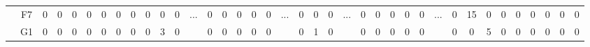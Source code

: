 \documentclass[12pt]{article}
\begin{document}
\begin{table}[!ht]
{\begin{tabular}{cccccccccccccccccccccccccccccccccccccc}
\multicolumn{1}{c|}{}                       & \multicolumn{1}{c|}{F7}  & \multicolumn{1}{c|}{0}  & \multicolumn{1}{c|}{0}  & \multicolumn{1}{c|}{0}  & \multicolumn{1}{c|}{0}  & \multicolumn{1}{c|}{0}  & \multicolumn{1}{c|}{0}  & \multicolumn{1}{c|}{0}  & \multicolumn{1}{c|}{0}  & \multicolumn{1}{c|}{0}  & \multicolumn{1}{c|}{0}  & \multicolumn{1}{c|}{\multirow{8}{*}{...}} & \multicolumn{1}{c|}{0}  & \multicolumn{1}{c|}{0}  & \multicolumn{1}{c|}{0}  & \multicolumn{1}{c|}{0}  & \multicolumn{1}{c|}{0}  & \multicolumn{1}{c|}{\multirow{8}{*}{...}} & \multicolumn{1}{c|}{0}  & \multicolumn{1}{c|}{0}  & \multicolumn{1}{c|}{0}  & \multicolumn{1}{c|}{\multirow{8}{*}{...}} & \multicolumn{1}{c|}{0}  & \multicolumn{1}{c|}{0}  & \multicolumn{1}{c|}{0}  & \multicolumn{1}{c|}{0}  & \multicolumn{1}{c|}{0}  & \multicolumn{1}{c|}{\multirow{8}{*}{...}} & \multicolumn{1}{c|}{0}  & \multicolumn{1}{c|}{15} & \multicolumn{1}{c|}{0}  & \multicolumn{1}{c|}{0}  & \multicolumn{1}{c|}{0}  & \multicolumn{1}{c|}{0}  & \multicolumn{1}{c|}{0}  & \multicolumn{1}{c|}{0}  & \multicolumn{1}{c|}{0}  \\ \cline{2-12} \cline{14-18} \cline{20-22} \cline{24-28} \cline{30-38} 
\multicolumn{1}{c|}{}                       & \multicolumn{1}{c|}{G1}  & \multicolumn{1}{c|}{0}  & \multicolumn{1}{c|}{0}  & \multicolumn{1}{c|}{0}  & \multicolumn{1}{c|}{0}  & \multicolumn{1}{c|}{0}  & \multicolumn{1}{c|}{0}  & \multicolumn{1}{c|}{0}  & \multicolumn{1}{c|}{0}  & \multicolumn{1}{c|}{3}  & \multicolumn{1}{c|}{0}  & \multicolumn{1}{c|}{}                     & \multicolumn{1}{c|}{0}  & \multicolumn{1}{c|}{0}  & \multicolumn{1}{c|}{0}  & \multicolumn{1}{c|}{0}  & \multicolumn{1}{c|}{0}  & \multicolumn{1}{c|}{}                     & \multicolumn{1}{c|}{0}  & \multicolumn{1}{c|}{1}  & \multicolumn{1}{c|}{0}  & \multicolumn{1}{c|}{}                     & \multicolumn{1}{c|}{0}  & \multicolumn{1}{c|}{0}  & \multicolumn{1}{c|}{0}  & \multicolumn{1}{c|}{0}  & \multicolumn{1}{c|}{0}  & \multicolumn{1}{c|}{}                     & \multicolumn{1}{c|}{0}  & \multicolumn{1}{c|}{0}  & \multicolumn{1}{c|}{5}  & \multicolumn{1}{c|}{0}  & \multicolumn{1}{c|}{0}  & \multicolumn{1}{c|}{0}  & \multicolumn{1}{c|}{0}  & \multicolumn{1}{c|}{0}  & \multicolumn{1}{c|}{0}  \\ \cline{2-12} \cline{14-18} \cline{20-22} \cline{24-28} \cline{30-38} 

\end{tabular}}
\end{table}
\end{document}
